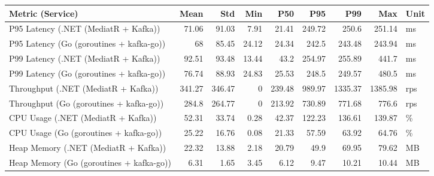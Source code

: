 \begin{tabular}{lrrrrrrrl}
\toprule
 Metric (Service)                         &   Mean &    Std &   Min &    P50 &    P95 &     P99 &     Max & Unit   \\
\midrule
 P95 Latency (.NET (MediatR + Kafka))     &  71.06 &  91.03 &  7.91 &  21.41 & 249.72 &  250.6  &  251.14 & ms     \\
 P95 Latency (Go (goroutines + kafka-go)) &  68    &  85.45 & 24.12 &  24.34 & 242.5  &  243.48 &  243.94 & ms     \\
 P99 Latency (.NET (MediatR + Kafka))     &  92.51 &  93.48 & 13.44 &  43.2  & 254.97 &  255.89 &  441.7  & ms     \\
 P99 Latency (Go (goroutines + kafka-go)) &  76.74 &  88.93 & 24.83 &  25.53 & 248.5  &  249.57 &  480.5  & ms     \\
 Throughput (.NET (MediatR + Kafka))      & 341.27 & 346.47 &  0    & 239.48 & 989.97 & 1335.37 & 1385.98 & rps    \\
 Throughput (Go (goroutines + kafka-go))  & 284.8  & 264.77 &  0    & 213.92 & 730.89 &  771.68 &  776.6  & rps    \\
 CPU Usage (.NET (MediatR + Kafka))       &  52.31 &  33.74 &  0.28 &  42.37 & 122.23 &  136.61 &  139.87 & \%      \\
 CPU Usage (Go (goroutines + kafka-go))   &  25.22 &  16.76 &  0.08 &  21.33 &  57.59 &   63.92 &   64.76 & \%      \\
 Heap Memory (.NET (MediatR + Kafka))     &  22.32 &  13.88 &  2.18 &  20.79 &  49.9  &   69.95 &   79.62 & MB     \\
 Heap Memory (Go (goroutines + kafka-go)) &   6.31 &   1.65 &  3.45 &   6.12 &   9.47 &   10.21 &   10.44 & MB     \\
\bottomrule
\end{tabular}